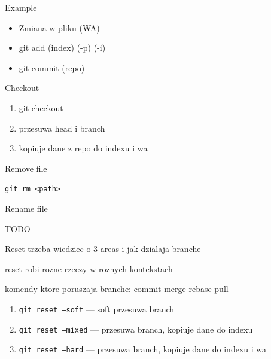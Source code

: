 \documentclass{beamer}
\begin{document}
    \begin{frame}{Example}
        \begin{itemize}[<+-| alert@+>]
            \item Zmiana w pliku (WA)
            \item git add (index) (-p) (-i)
            \item git commit (repo)
        \end{itemize}
    \end{frame}

    \begin{frame}{Checkout}
        \begin{enumerate}[<+-| alert@+>]
            \item git checkout
            \item przesuwa head i branch
            \item kopiuje dane z repo do indexu i wa
        \end{enumerate}
    \end{frame}

    \begin{frame}{Remove file}
        \begin{center}
            \texttt{git rm <path>}
        \end{center}
    \end{frame}

    \begin{frame}{Rename file}
        \begin{center}
            TODO
        \end{center}
    \end{frame}

    \begin{frame}{Reset}
        trzeba wiedziec o 3 areas i jak dzialaja branche

        reset robi rozne rzeczy w roznych kontekstach

        komendy ktore poruszaja branche: commit merge rebase pull
        \begin{enumerate}[<+-| alert@+>]
            \item\texttt{git reset --soft} --- soft przesuwa branch
            \item\texttt{git reset --mixed} --- przesuwa branch, kopiuje dane do indexu
            \item\texttt{git reset --hard} --- przesuwa branch, kopiuje dane do indexu i wa
        \end{enumerate}
    \end{frame}
\end{document}
